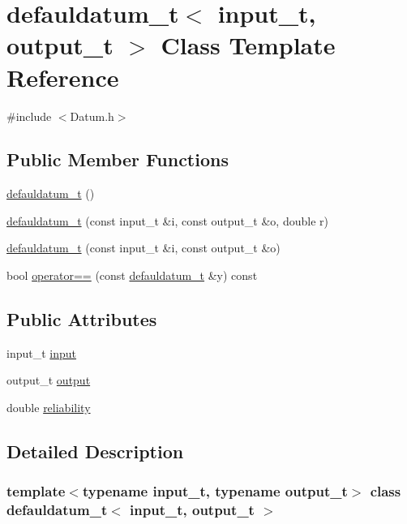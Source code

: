\hypertarget{classdefauldatum__t}{}\section{defauldatum\+\_\+t$<$ input\+\_\+t, output\+\_\+t $>$ Class Template Reference}
\label{classdefauldatum__t}


{\ttfamily \#include $<$Datum.\+h$>$}

\subsection*{Public Member Functions}
\begin{DoxyCompactItemize}
\item 
\hyperlink{classdefauldatum__t_a60dbe7a244471992011e822a274111fb}{defauldatum\+\_\+t} ()
\item 
\hyperlink{classdefauldatum__t_aec837adfff605f08b75e8157f542fb90}{defauldatum\+\_\+t} (const input\+\_\+t \&i, const output\+\_\+t \&o, double r)
\item 
\hyperlink{classdefauldatum__t_a338eb6eda0b2c7adb2b83476b57561d3}{defauldatum\+\_\+t} (const input\+\_\+t \&i, const output\+\_\+t \&o)
\item 
bool \hyperlink{classdefauldatum__t_a96eb1be1316177eb30d9bbc4a5405a9c}{operator==} (const \hyperlink{classdefauldatum__t}{defauldatum\+\_\+t} \&y) const
\end{DoxyCompactItemize}
\subsection*{Public Attributes}
\begin{DoxyCompactItemize}
\item 
input\+\_\+t \hyperlink{classdefauldatum__t_a282269cf029cd4068c94db8c8edee01e}{input}
\item 
output\+\_\+t \hyperlink{classdefauldatum__t_abe0955067e70651670dfe3031eda1efb}{output}
\item 
double \hyperlink{classdefauldatum__t_a113548381865b87bd1332d8c73e56608}{reliability}
\end{DoxyCompactItemize}


\subsection{Detailed Description}
\subsubsection*{template$<$typename input\+\_\+t, typename output\+\_\+t$>$\newline
class defauldatum\+\_\+t$<$ input\+\_\+t, output\+\_\+t $>$}

